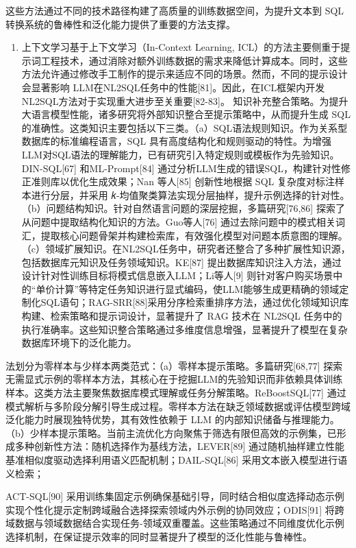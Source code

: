 \documentclass[12pt,a4paper,openright,UTF8]{ctexbook}
\begin{document}
这些方法通过不同的技术路径构建了高质量的训练数据空间，为提升文本到 SQL转换系统的鲁棒性和泛化能力提供了重要的方法支撑。

\begin{enumerate}[label=(\arabic*)]
\item 上下文学习基于上下文学习（In-Context Learning, ICL）的方法主要侧重于提示词工程技术，通过消除对额外训练数据的需求来降低计算成本。同时，这些方法允许通过修改手工制作的提示来适应不同的场景。然而，不同的提示设计会显著影响 LLM在NL2SQL任务中的性能[81]。因此，在ICL框架内开发NL2SQL方法对于实现重大进步至关重要[82-83]。 知识补充整合策略。为提升大语言模型性能，诸多研究将外部知识整合至提示策略中，从而提升生成 SQL 的准确性。这类知识主要包括以下三类。（a）SQL语法规则知识。作为关系型数据库的标准编程语言，SQL 具有高度结构化和规则驱动的特性。为增强LLM对SQL语法的理解能力，已有研究引入特定规则或模板作为先验知识。DIN-SQL[67] 和ML-Prompt[84] 通过分析LLM生成的错误SQL，构建针对性修正准则库以优化生成效果；Nan 等人[85] 创新性地根据 SQL 复杂度对标注样本进行分层，并采用 𝑘-均值聚类算法实现分层抽样，提升示例选择的针对性。（b）问题结构知识。针对自然语言问题的深层挖掘，多篇研究[76,86] 探索了从问题中提取结构化知识的方法。Guo等人[76] 通过去除问题中的模式相关词汇，提取核心问题骨架并构建检索库，有效强化模型对问题本质意图的理解。（c）领域扩展知识。在NL2SQL任务中，研究者还整合了多种扩展性知识源，包括数据库元知识及任务领域知识。KE[87] 提出数据库知识注入方法，通过设计针对性训练目标将模式信息嵌入LLM；Li等人[9] 则针对客户购买场景中的“单价计算”等特定任务知识进行显式编码，使LLM能够生成更精确的领域定制化SQL语句；RAG-SRR[88]采用分序检索重排序方法，通过优化领域知识库构建、检索策略和提示词设计，显著提升了 RAG 技术在 NL2SQL 任务中的执行准确率。这些知识整合策略通过多维度信息增强，显著提升了模型在复杂数据库环境下的泛化能力。
\end{enumerate}


法划分为零样本与少样本两类范式：（a）零样本提示策略。多篇研究[68,77] 探索无需显式示例的零样本方法，其核心在于挖掘LLM的先验知识而非依赖具体训练样本。这类方法主要聚焦数据库模式理解或任务分解策略。ReBoostSQL[77] 通过模式解析与多阶段分解引导生成过程。零样本方法在缺乏领域数据或评估模型跨域泛化能力时展现独特优势，其有效性依赖于 LLM 的内部知识储备与推理能力。（b）少样本提示策略。当前主流优化方向聚焦于筛选有限但高效的示例集，已形成多种创新性方法：随机选择作为基线方法，LEVER[89] 通过随机抽样建立性能基准相似度驱动选择利用语义匹配机制；DAIL-SQL[86] 采用文本嵌入模型进行语义检索；


ACT-SQL[90] 采用训练集固定示例确保基础引导，同时结合相似度选择动态示例实现个性化提示定制跨域融合选择探索领域内外示例的协同效应；ODIS[91] 将跨域数据与领域数据结合实现任务-领域双重覆盖。这些策略通过不同维度优化示例选择机制，在保证提示效率的同时显著提升了模型的泛化性能与鲁棒性。
\end{document}
